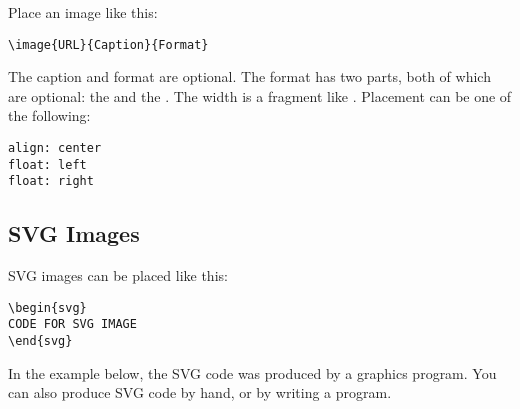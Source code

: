 Place an image like this:

\begin{verbatim}
\image{URL}{Caption}{Format}
\end{verbatim}

The caption and format are optional.  The format has two parts, both of which are optional: the  and the . The width is a fragment like .  Placement can be one of the following:

\begin{verbatim}
align: center
float: left
float: right
\end{verbatim}


\subsection{SVG Images}

SVG images can be placed like this:

\begin{verbatim}
\begin{svg}
CODE FOR SVG IMAGE
\end{svg}
\end{verbatim}

In the example below, the SVG code was produced by a graphics program.  You can also produce SVG code by hand, or by writing a program.

